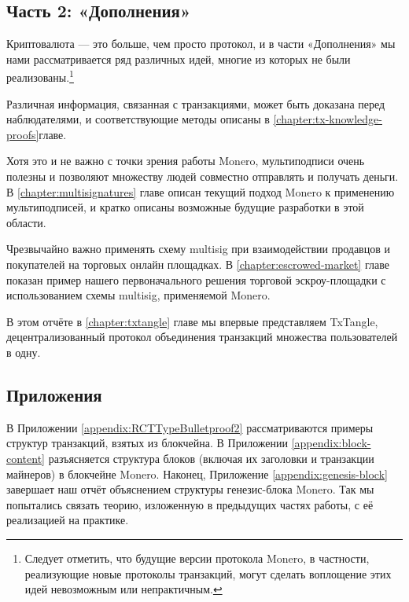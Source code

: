 \subsection{Часть 2: «Дополнения»}

Криптовалюта — это больше, чем просто протокол, и в части «Дополнения» мы нами рассма\-тривается ряд различных идей, многие из которых не были реализованы.\footnote{Следует отметить, что будущие версии протокола Monero, в частности, реализующие новые протоколы транзакций, могут сделать воплощение этих идей невозможным или непрактичным.}

Различная информация, связанная с транзакциями, может быть доказана перед наблюдателя\-ми, и соответствующие методы описаны в \ref{chapter:tx-knowledge-proofs}главе.

Хотя это и не важно с точки зрения работы Monero, мультиподписи очень полезны и позволя\-ют множеству людей совместно отправлять и получать деньги. В \ref{chapter:multisignatures} главе описан текущий подход Monero к применению мультиподписей, и кратко описаны возможные будущие разра\-ботки в этой области.%

Чрезвычайно важно применять схему multisig при взаимодействии продавцов и покупателей на торговых онлайн площадках. В \ref{chapter:escrowed-market} главе показан пример нашего первоначального решения торговой эскроу-площадки с использованием схемы multisig, применяемой Monero.

В этом отчёте в \ref{chapter:txtangle} главе мы впервые представляем TxTangle, децентрализованный протокол объединения транзакций множества пользователей в одну.


\subsection{Приложения}

В Приложении \ref{appendix:RCTTypeBulletproof2} рассматриваются примеры структур транзакций, взятых из блокчейна. В Приложении \ref{appendix:block-content} разъясняется структура блоков (включая их заголовки и транзакции майнеров) в блокчейне Monero. Наконец, Приложение \ref{appendix:genesis-block} завершает наш отчёт объяснением структуры генезис-блока Monero. Так мы попытались связать теорию, изложенную в предыдущих частях работы, с её реализацией на практике.

